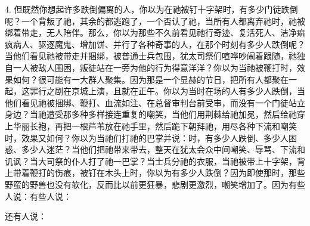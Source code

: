4. 但既然你想起许多跌倒偏离的人，你以为在祂被钉十字架时，有多少门徒跌倒呢？一个背叛了祂，其余的都逃跑了，一个否认了祂，当所有人都离弃祂时，祂被绑着带走，无人陪伴。\newline{}那么，你以为那些不久前看见祂行奇迹、复活死人、洁净痲疯病人、驱逐魔鬼、增加饼、并行了各种奇事的人，在那个时刻有多少人跌倒呢？当他们看见祂被带走并捆绑，被普通士兵包围，犹太司祭们喧哗吵闹着跟随，祂独自一人被敌人围困，叛徒站在一旁为他的行为得意洋洋？\newline{}你以为当祂被鞭打时，效果如何？很可能有一大群人聚集。因为那是一个显赫的节日，把所有人都聚在一起，这罪行之剧在京城上演，且就在正午。你以为当时在场的人有多少人跌倒，当他们看见祂被捆绑、鞭打、血流如注、在总督审判台前受审，而没有一个门徒站立身边？\newline{}当祂遭受那多种多样接连重复的嘲笑，当他们用荆棘给祂加冕，然后给祂穿上华丽长袍，再把一根芦苇放在祂手里，然后跪下朝拜祂，用尽各种下流和嘲笑时，效果又如何？\newline{}你以为当祂们打祂的巴掌并说：时，有多少人跌倒、多少人困惑、多少人迷茫？当他们把祂带来带去，整天在犹太会众中间嘲笑、辱骂、下流和讥讽？当大司祭的仆人打了祂一巴掌？当士兵分祂的衣服，当祂被带上十字架，背上带着鞭打的伤痕，被钉在木头上时，你以为有多少人跌倒？\newline{}因为即使那时，那些野蛮的野兽也没有软化，反而比以前更狂暴，悲剧更激烈，嘲笑增加了。因为有些人说：有些人说：\par

还有人说：\par

